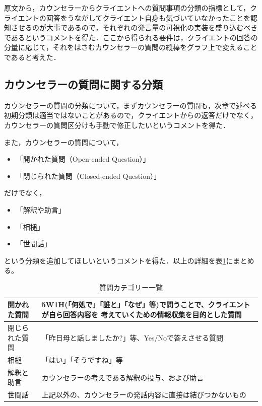 \documentclass[shuuron]{kuee}
\begin{document}
原文から，カウンセラーからクライエントへの質問事項の分類の指標として，クライエントの回答をうながしてクライエント自身も気づいていなかったことを認知させるのが大事であるので，それぞれの発言量の可視化の実装を盛り込むべきであるというコメントを得た．ここから得られる要件は，クライエントの回答の分量に応じて，それをはさむカウンセラーの質問の縦棒をグラフ上で変えることであると考えた．

\subsection{カウンセラーの質問に関する分類}

カウンセラーの質問の分類について，まずカウンセラーの質問も，次章で述べる初期分類は適当ではないことがあるので，クライエントからの返答だけでなく，カウンセラーの質問区分けも手動で修正したいというコメントを得た．

また，カウンセラーの質問について，
\begin{itemize}
  \item 「開かれた質問（Open-ended Question）」
  \item 「閉じられた質問（Closed-ended Question）」

\end{itemize}
だけでなく，
\begin{itemize}
  \item 「解釈や助言」
  \item 「相槌」
  \item 「世間話」
\end{itemize}

という分類を追加してほしいというコメントを得た．以上の詳細を表\ref{table:queCate}にまとめる。
\begin{table}
  \caption{質問カテゴリー一覧}
  \label{table:queCate}
  \begin{center}
    \begin{tabular}{|l|p{7cm}|} \hline
      開かれた質問 & 5W1H(「何処で」「誰と」「なぜ」等)で問うことで、クライエントが自ら回答内容を
      考えていくための情報収集を目的とした質問
      \\ \hline
      閉じられた質問  & 「昨日母と話しましたか?」等、Yes/Noで答えさせる質問
      \\ \hline
      相槌 & 「はい」「そうですね」等
      \\ \hline
      解釈と助言  &  カウンセラーの考えである解釈の投与、および助言\\ \hline
      世間話 & 上記以外の、カウンセラーの発話内容に直接は結びつかないもの \\ \hline
    \end{tabular}
  \end{center}
\end{table}
\end{document}
